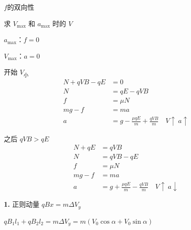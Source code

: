 $f$的双向性

\begin{problem}
求 $V_{\max}$ 和 $a_{\max}$ 时的 $V$
\begin{solution}
$a_{\max}$：$f=0$ %

$V_{\max}$：$a=0$

\noindent
\begin{minipage}[t]{0.48\linewidth}
开始 $V_{\text{小}}$
\begin{align*}
N+qVB-qE&=0\\
N&=qE-qVB\\
f&=\mu N\\
mg-f&=ma\\
a&=g-\frac{\mu qE}{m}+\frac{qVB}{m}\quad V\uparrow\ a\uparrow
\end{align*}
\end{minipage}\hfill
\begin{minipage}[t]{0.48\linewidth}
之后 $qVB>qE$
\begin{align*}
N+qE&=qVB\\
N&=qVB-qE\\
f&=\mu N\\
mg-f&=ma\\
a&=g+\frac{\mu qE}{m}-\frac{qVB}{m}\quad V\uparrow\ a\downarrow
\end{align*}
\end{minipage}
\end{solution}
\end{problem}
\textbf{1.} 正则动量 \quad $qBx=m\Delta V_y$ \quad {} \quad {}

$qB_1l_1+qB_2l_2=m\Delta V_y=m(V_0\cos\alpha+V_0\sin\alpha)$

